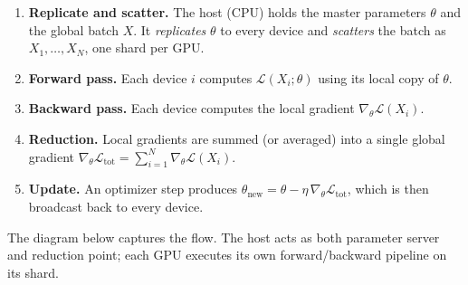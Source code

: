 \documentclass[11pt,a4paper]{article}
\theoremstyle{definition}
\theoremstyle{remark}
\theoremstyle{plain}
\newcommand{\grad}{\nabla_{\theta}}
\newcommand{\Loss}{\mathcal{L}}
\begin{document}
\begin{enumerate}[leftmargin=1.8em, itemsep=2pt, label=\textbf{\arabic*.}]
  \item \textbf{Replicate and scatter.} The host (CPU) holds the master
        parameters $\theta$ and the global batch $X$. It
        \emph{replicates} $\theta$ to every device and \emph{scatters}
        the batch as $X_1,\ldots,X_N$, one shard per GPU.
  \item \textbf{Forward pass.} Each device $i$ computes
        $\Loss(X_i;\theta)$ using its local copy of $\theta$.
  \item \textbf{Backward pass.} Each device computes the local gradient
        $\grad \Loss(X_i)$.
  \item \textbf{Reduction.} Local gradients are summed (or averaged) into
        a single global gradient
        $\grad \Loss_{\text{tot}} = \sum_{i=1}^N \grad \Loss(X_i)$.
  \item \textbf{Update.} An optimizer step produces
        $\theta_{\text{new}} = \theta - \eta \,\grad \Loss_{\text{tot}}$,
        which is then broadcast back to every device.
\end{enumerate}

The diagram below captures the flow. The host acts as both parameter
server and reduction point; each GPU executes its own forward/backward
pipeline on its shard.
\end{document}
